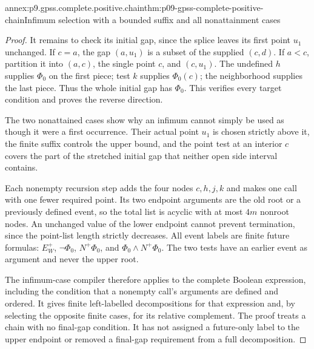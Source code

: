\begin{annexitem}{annex:p9.gpss.complete.positive.chain}{thm:p09-gpss-complete-positive-chain}{Infimum selection with a bounded suffix and all nonattainment cases}
\begin{proof}
It remains to check its initial
gap, since the splice leaves
its first point \(u_1\)
unchanged. If \(c=a\), the
gap \((a,u_1)\) is a subset
of the supplied \((c,d)\).
If \(a<c\), partition it
into \((a,c)\), the single
point \(c\), and \((c,u_1)\).
The undefined \(h\) supplies
\(\Phi_0\) on the first
piece; test \(k\) supplies
\(\Phi_0(c)\); the neighborhood
supplies the last piece.
Thus the whole initial gap
has \(\Phi_0\). This verifies
every target condition and
proves the reverse direction.

The two nonattained cases show
why an infimum cannot simply
be used as though it were
a first occurrence. Their
actual point \(u_1\) is chosen
strictly above it, the finite
suffix controls the upper
bound, and the point test
at an interior \(c\) covers
the part of the stretched
initial gap that neither
open side interval contains.

Each nonempty recursion step
adds the four nodes \(c,h,j,k\)
and makes one call with one
fewer required point. Its
two endpoint arguments are
the old root or a previously
defined event, so the total
list is acyclic with at
most \(4m\) nonroot nodes.
An unchanged value of the
lower endpoint cannot prevent
termination, since the
point-list length strictly
decreases. All event labels
are finite future formulas:
\(E^+_W\), \(\neg\Phi_0\),
\(N^+\Phi_0\), and
\(\Phi_0\land N^+\Phi_0\).
The two tests have an
earlier event as argument
and never the upper root.

The infimum-case compiler
therefore applies to the
complete Boolean expression,
including the condition that
a nonempty call's arguments
are defined and ordered.
It gives finite left-labelled
decompositions for that
expression and, by selecting
the opposite finite cases,
for its relative complement.
The proof treats a chain
with no final-gap condition.
It has not assigned a
future-only label to the
upper endpoint or removed
a final-gap requirement
from a full decomposition.
\end{proof}
\end{annexitem}

